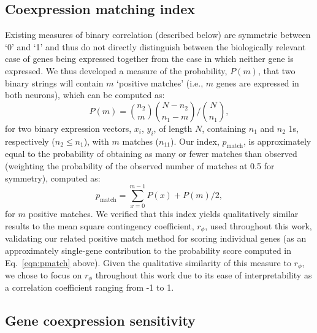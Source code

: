 \documentclass[10pt,letterpaper]{article}
\begin{document}
\subsection*{Coexpression matching index}

Existing measures of binary correlation (described below) are symmetric between `0' and `1' and thus do not directly distinguish between the biologically relevant case of genes being expressed together from the case in which neither gene is expressed.
We thus developed a measure of the probability, $P(m)$, that two binary strings will contain $m$ `positive matches' (i.e., $m$ genes are expressed in both neurons), which can be computed as:
\begin{equation} \label{eqn:positiveMatch}
    P(m) = \binom{n_2}{m} \binom{N-n_2}{n_1-m} / \binom{N}{n_1},
\end{equation}
for two binary expression vectors, $x_i$, $y_i$, of length $N$, containing $n_1$ and $n_2$ 1s, respectively ($n_2 \leq n_1$), with $m$ matches ($n_{11}$).
Our index, $p_\mathrm{match}$, is approximately equal to the probability of obtaining as many or fewer matches than observed (weighting the probability of the observed number of matches at 0.5 for symmetry), computed as:
\begin{equation} \label{eqn:pmatch}
     p_\mathrm{match} = \sum_{x=0}^{m-1} P(x) + P(m)/2,
\end{equation}
for $m$ positive matches.
We verified that this index yields qualitatively similar results to the mean square contingency coefficient, $r_\phi$, used throughout this work, validating our related positive match method for scoring individual genes (as an approximately single-gene contribution to the probability score computed in Eq.~\ref{eqn:pmatch} above).
Given the qualitative similarity of this measure to $r_\phi$, we chose to focus on $r_\phi$ throughout this work due to its ease of interpretability as a correlation coefficient ranging from -1 to 1.

\subsection*{Gene coexpression sensitivity}
\end{document}
